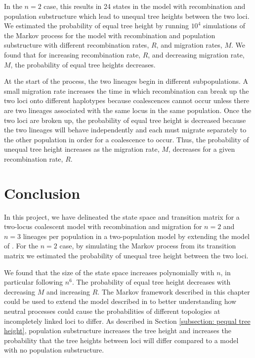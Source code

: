 \documentclass[11pt,oneside]{amsart}
\begin{document}
In the $n = 2$ case, this results in 24 states in the model with recombination and population substructure which lead to unequal tree heights between the two loci. We estimated the probability of equal tree height by running $10^4$ simulations of the Markov process for the model with recombination and population substructure with different recombination rates, $R$, and migration rates, $M$. We found that for increasing recombination rate, $R$, and decreasing migration rate, $M$, the probability of equal tree heights decreases.

At the start of the process, the two lineages begin in different subpopulations. A small migration rate increases the time in which recombination can break up the two loci onto different haplotypes because coalescences cannot occur unless there are two lineages associated with the same locus in the same population. Once the two loci are broken up, the probability of equal tree height is decreased because the two lineages will behave independently and each must migrate separately to the other population in order for a coalescence to occur. Thus, the probability of unequal tree height increases as the migration rate, $M$, decreases for a given recombination rate, $R$.


\section{Conclusion}
\label{Section: conclusion}

In this project, we have delineated the state space and transition matrix for a two-locus coalescent model with recombination and migration for $n = 2$ and $n = 3$ lineages per population in a two-population model by extending the model of \cite{SimonsenChurchill1997}. For the $n = 2$ case, by simulating the Markov process from its transition matrix we estimated the probability of unequal tree height between the two loci.

We found that the size of the state space increases polynomially with $n$, in particular following $n^6$. The probability of equal tree height decreases with decreasing $M$ and increasing $R$. The Markov framework described in this chapter could be used to extend the model described in \cite{SlatkinPollack2008} to better understanding how neutral processes could cause the probabilities of different topologies at incompletely linked loci to differ. As described in Section \ref{subsection: pequal tree height}, population substructure increases the tree height and increases the probability that the tree heights between loci will differ compared to a model with no population substructure. 
\end{document}

